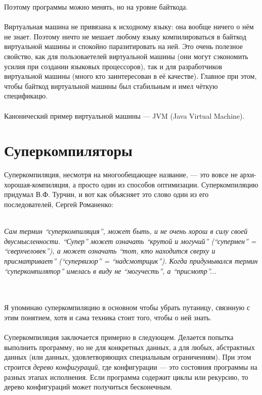 \documentclass[11pt]{book}
\begin{document}
Поэтому программы можно менять, но на уровне байткода.
\\ \\
Виртуальная машина не привязана к исходному языку: она вообще ничего о нём не знает.
Поэтому ничто не мешает любому языку компилироваться в байткод виртуальной машины и спокойно паразитировать на ней.
Это очень полезное свойство, как для пользоваетелей виртуальной машины
(они могут сэкономить усилия при создании языковых процессоров),
так и для разработчиков виртуальной машины (много кто заинтересован в её качестве).
Главное при этом, чтобы байткод виртуальной машины был стабильным и имел чёткую спецификацю.
\\ \\
Канонический пример виртуальной машины --- JVM (Java Virtual Machine).

\section{Суперкомпиляторы}
Суперкомпиляция, несмотря на многообещающее название, --- это вовсе не архи-хорошая-компиляция, а просто один из способов оптимизации.
Суперкомпиляцию придумал В.Ф. Турчин, и вот как объясняет это слово один из его последователей, Сергей Романенко:
\\ \\
\begin{footnotesize}
\emph{
Сам термин ``суперкомпиляция'', может быть, и не очень хорош в силу своей двусмысленности.
``Супер'' может означать ``крутой и могучий'' (``супермен'' = ``сверхчеловек''),
а может означать ``тот, кто находится сверху и присматривает'' (``супервизор'' = ``надсмотрщик'').
Когда придумывался термин ``суперкомпилятор'' имелась в виду не ``могучесть'', а ``присмотр''...
}
\end{footnotesize}
\\ \\
Я упоминаю суперкомпиляцию в основном чтобы убрать путаницу, связнную с этим понятием,
хотя и сама техника стоит того, чтобы о ней знать.
\\ \\
Суперкомпиляция заключается примерно в следующем.
Делается попытка выполнить программу, но не для конкретных данных, а для любых, абстрактных данных (или данных, удовлетворяющих специальным ограничениям).
При этом строится \emph{дерево конфигураций}, где конфигурации --- это состояния программы на разных этапах исполнения.
Если программа содержит циклы или рекурсию, то дерево конфигураций может получиться бесконечным.
\end{document}
